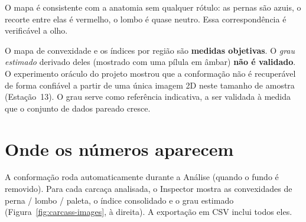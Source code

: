 
O mapa é consistente com a anatomia sem qualquer rótulo: as pernas são
azuis, o recorte entre elas é vermelho, o lombo é quase neutro. Essa
correspondência é verificável a olho.

\begin{caution}[title={O grau estimado não é validado}]
O mapa de convexidade e os índices por região são \textbf{medidas objetivas}.
O \emph{grau estimado} derivado deles (mostrado com uma pílula  em
âmbar) \textbf{não é validado}. O experimento oráculo do projeto mostrou que
a conformação não é recuperável de forma confiável a partir de uma única imagem 2D neste
tamanho de amostra (Estação~13). O grau serve como referência indicativa, a ser
validada à medida que o conjunto de dados pareado cresce.
\end{caution}

\section{Onde os números aparecem}

A conformação roda automaticamente durante a Análise (quando o fundo é removido).
Para cada carcaça analisada, o Inspector mostra as convexidades de perna / lombo / paleta,
o índice consolidado e o grau estimado
(Figura~\ref{fig:carcass-images}, à direita). A exportação em CSV inclui todos eles.
